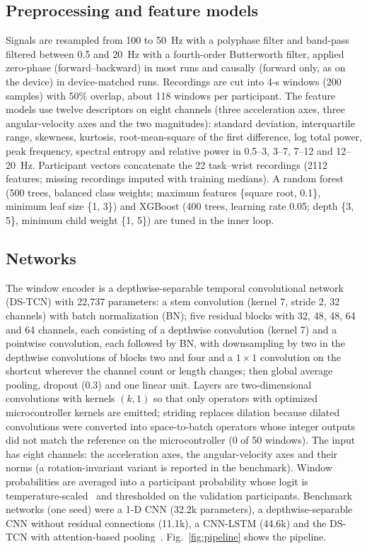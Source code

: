 \documentclass[preprint,12pt]{elsarticle}
\begin{document}
\subsection{Preprocessing and feature models}
Signals are resampled from 100 to 50~Hz with a polyphase filter and band-pass filtered between 0.5 and 20~Hz with a fourth-order Butterworth filter, applied zero-phase (forward--backward) in most runs and causally (forward only, as on the device) in device-matched runs. Recordings are cut into 4-s windows (200 samples) with 50\% overlap, about 118 windows per participant. The feature models use twelve descriptors on eight channels (three acceleration axes, three angular-velocity axes and the two magnitudes): standard deviation, interquartile range, skewness, kurtosis, root-mean-square of the first difference, log total power, peak frequency, spectral entropy and relative power in 0.5--3, 3--7, 7--12 and 12--20~Hz. Participant vectors concatenate the 22 task--wrist recordings (2112 features; missing recordings imputed with training medians). A random forest (500 trees, balanced class weights; maximum features \{square root, 0.1\}, minimum leaf size \{1, 3\}) and XGBoost (400 trees, learning rate 0.05; depth \{3, 5\}, minimum child weight \{1, 5\}) are tuned in the inner loop.

\subsection{Networks}
The window encoder is a depthwise-separable temporal convolutional network (DS-TCN) with 22,737 parameters: a stem convolution (kernel 7, stride 2, 32 channels) with batch normalization (BN); five residual blocks with 32, 48, 48, 64 and 64 channels, each consisting of a depthwise convolution (kernel 7) and a pointwise convolution, each followed by BN, with downsampling by two in the depthwise convolutions of blocks two and four and a $1\times1$ convolution on the shortcut wherever the channel count or length changes; then global average pooling, dropout (0.3) and one linear unit. Layers are two-dimensional convolutions with kernels $(k,1)$ so that only operators with optimized microcontroller kernels are emitted; striding replaces dilation because dilated convolutions were converted into space-to-batch operators whose integer outputs did not match the reference on the microcontroller (0 of 50 windows). The input has eight channels: the acceleration axes, the angular-velocity axes and their norms (a rotation-invariant variant is reported in the benchmark). Window probabilities are averaged into a participant probability whose logit is temperature-scaled~\cite{Guo2017} and thresholded on the validation participants. Benchmark networks (one seed) were a 1-D CNN (32.2k parameters), a depthwise-separable CNN without residual connections (11.1k), a CNN-LSTM (44.6k) and the DS-TCN with attention-based pooling~\cite{Ilse2018}. Fig.~\ref{fig:pipeline} shows the pipeline.
\end{document}
